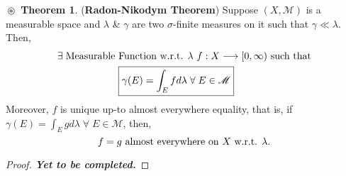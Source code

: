 \documentclass{article}
\theoremstyle{definition}
\newtheorem{theorem}{$\boxed{\boxed{\circledast}}$ Theorem}
\theoremstyle{remark}
\theoremstyle{definition}
\theoremstyle{definition}
\theoremstyle{definition}
\newcommand{\alg}[1]{\mathscr{#1}}
\begin{document}
\hrulefill
\begin{theorem}\label{T-20}
	(\textbf{Radon-Nikodym Theorem}) Suppose $ (X,\alg{M}) $ is a measurable space and $ \lambda $ \& $ \gamma $ are two $ \sigma $-finite measures on it such that $ \gamma \ll \lambda $. Then,
	\begin{align*}
		\exists \;\text{Measurable }&\text{Function w.r.t. $ \lambda $ }  f : X \longrightarrow [0,\infty)  \text{ such that}\\
		&\boxed{\gamma(E) = \int_{E}fd\lambda \;\forall\;E\in \alg{M}}
	\end{align*}
Moreover, $ f $ is unique up-to almost everywhere equality, that is, if $ \gamma(E) =\int_{E}gd\lambda \;\forall\;E\in\alg{M}$, then,
\[f = g\text{ almost everywhere on $ X $ w.r.t. $ \lambda $.}\]
\end{theorem}
\begin{proof}
	\textbf{\emph{Yet to be completed.}}
\end{proof}
\newpage
\end{document}
